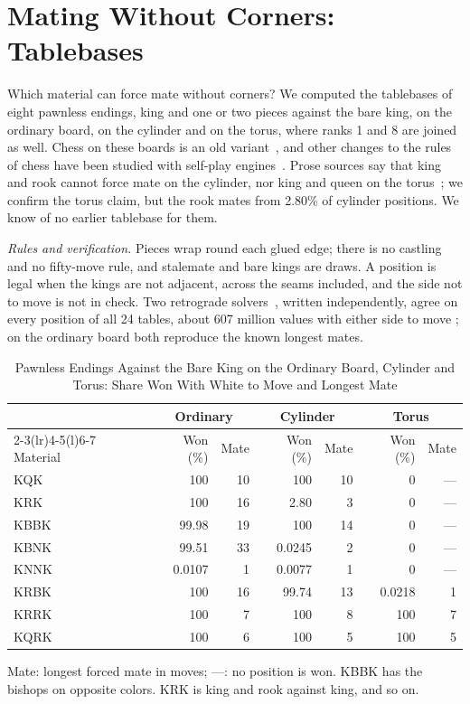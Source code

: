 \section{Mating Without Corners: Tablebases}\label{sec:tb}

Which material can force mate without corners? We computed the tablebases of eight pawnless endings,
king and one or two pieces against the bare king, on the ordinary board, on the cylinder and on the torus, where
ranks 1 and 8 are joined as well. Chess on these boards is an old variant~\cite{Pritchard}, and other changes to the rules of chess have been studied with
self-play engines~\cite{Tomasev2022}. Prose sources say
that king and rook cannot force mate on the cylinder, nor king and queen on the torus~\cite{WikiCylinder,HGMCylinder};
we confirm the torus claim, but the rook mates from 2.80\% of cylinder positions. We know of no earlier tablebase
for them.

\emph{Rules and verification.} Pieces wrap round each glued edge; there is no castling and no fifty-move rule,
and stalemate and bare kings are draws. A position is legal when the kings are not adjacent, across the seams
included, and the side not to move is not in check. Two retrograde solvers~\cite{Thompson1986}, written independently, agree on
every position of all 24 tables, about 607 million values with either side to move ; on the ordinary
board both reproduce the known longest mates.

\begin{table}[!t]
\centering
\caption{Pawnless Endings Against the Bare King on the Ordinary Board, Cylinder and Torus: Share Won With
White to Move and Longest Mate }
\label{tab:tb}
\footnotesize
\setlength{\tabcolsep}{4.5pt}
\begin{tabular}{@{}lrrrrrr@{}}
\toprule
& \multicolumn{2}{c}{Ordinary} & \multicolumn{2}{c}{Cylinder} & \multicolumn{2}{c}{Torus} \\
\cmidrule(lr){2-3}\cmidrule(lr){4-5}\cmidrule(l){6-7}
Material & Won (\%) & Mate & Won (\%) & Mate & Won (\%) & Mate \\
\midrule
KQK  & 100    & 10 & 100    & 10 & 0      & --- \\
KRK  & 100    & 16 & 2.80   & 3  & 0      & --- \\
KBBK & 99.98  & 19 & 100    & 14 & 0      & --- \\
KBNK & 99.51  & 33 & 0.0245 & 2  & 0      & --- \\
KNNK & 0.0107 & 1  & 0.0077 & 1  & 0      & --- \\
KRBK & 100    & 16 & 99.74  & 13 & 0.0218 & 1   \\
KRRK & 100    & 7  & 100    & 8  & 100    & 7   \\
KQRK & 100    & 6  & 100    & 5  & 100    & 5   \\
\bottomrule
\end{tabular}

\smallskip
\parbox{\columnwidth}{\footnotesize Mate: longest forced mate in moves; ---: no position is won. KBBK has
the bishops on opposite colors. KRK is king and rook against king, and so on.}
\end{table}

